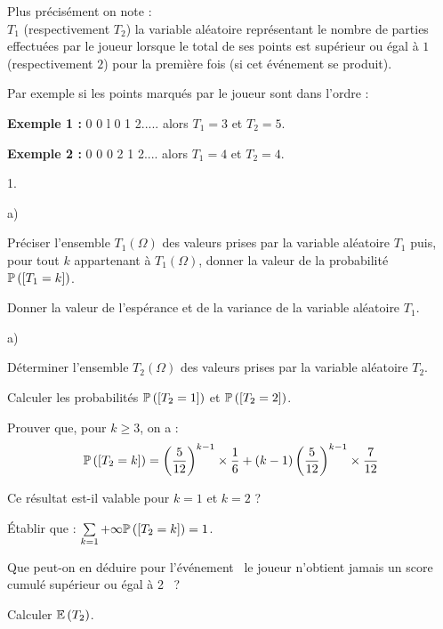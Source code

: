 \documentclass[11pt]{article}%
\begin{document}
Plus précisément on note : \\
$T_{1}$ (respectivement $T_{2}$) la variable aléatoire représentant
le nombre de parties effectuées par le joueur lorsque le total de ses
points est supérieur ou égal à $1$ (respectivement $2$) pour la
première fois (si cet événement se produit).

Par exemple si les points marqués par le joueur sont dans l'ordre :

\textbf{Exemple 1 :} 0 0 l 0 1 2..... alors $T_{1} = 3$ et $T_{2} = 5$.

\textbf{Exemple 2 :} 0 0 0 2 1 2.... alors $T_{1} = 4$ et $T_{2} = 4$.

\begin{noliste}{1.}
 \setlength{\itemsep}{4mm}
\item
\begin{noliste}{a)}
 \setlength{\itemsep}{2mm}
\item Préciser l'ensemble $T_{1}\left( \Omega \right) $ des valeurs
prises par la variable aléatoire $T_{1}$ puis, pour tout $k$
appartenant
à $T_{1}\left( \Omega \right) $, donner la valeur de la probabilité
$\mathbb{P}\left(\left[ { T_{1} = k} \right]\right) $.

\item Donner la valeur de l'espérance et de la variance de la variable
aléatoire $T_{1}$.
\end{noliste}

\item
\begin{noliste}{a)}
 \setlength{\itemsep}{2mm}
\item Déterminer l'ensemble $T_{2}\left( \Omega \right) $ des valeurs
prises par la variable aléatoire $T_{2}$.

\item Calculer les probabilités $\mathbb{P}\left(\left[ { T_{2} = 1} \right]\right) $ et
$\mathbb{P}\left(\left[ { T_{2} = 2} \right]\right) $.

\item Prouver que, pour $k\geq 3$, on a :
\[
\mathbb{P}\left(\left[ { T_{2} = k} \right]\right) = \left( \frac{5}{12}\right)
^{k-1}\times
\frac{1}{6} + \left( k-1\right) \left( \frac{5}{12}\right) ^{k-1}\times
\frac{7}{12}
\]

\item Ce résultat est-il valable pour $k = 1$ et $k = 2$ ?

\item Établir que : $\sum \limits_{k = 1}{+ \infty }\mathbb{P}\left(\left[ {
T_{2} = k} \right]\right) = 1$.

\item Que peut-on en déduire pour l'événement \guillemotleft \ le
joueur n'obtient jamais un score cumulé supérieur ou égal à
2 \guillemotright \ ?

\item Calculer $\mathbb{E}\left( T_{2}\right) $.
\end{noliste}
\end{noliste}
\end{document}
